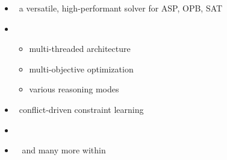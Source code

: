 \begin{frame}{\clasp}
  \begin{itemize}
  \item {} \ a versatile, high-performant solver for ASP, OPB, SAT
  \item {}
    \begin{itemize}
    \item multi-threaded architecture
    \item multi-objective optimization
    \item various reasoning modes
    \end{itemize}
  \item {}   \  conflict-driven constraint learning
  \item {}   \ \cite{gekasc09c,gekasc12b,gekakasc12a}
  \item {} \ \cite{nefrle18a} and many more within \clingo
  \end{itemize}
\end{frame}
%
